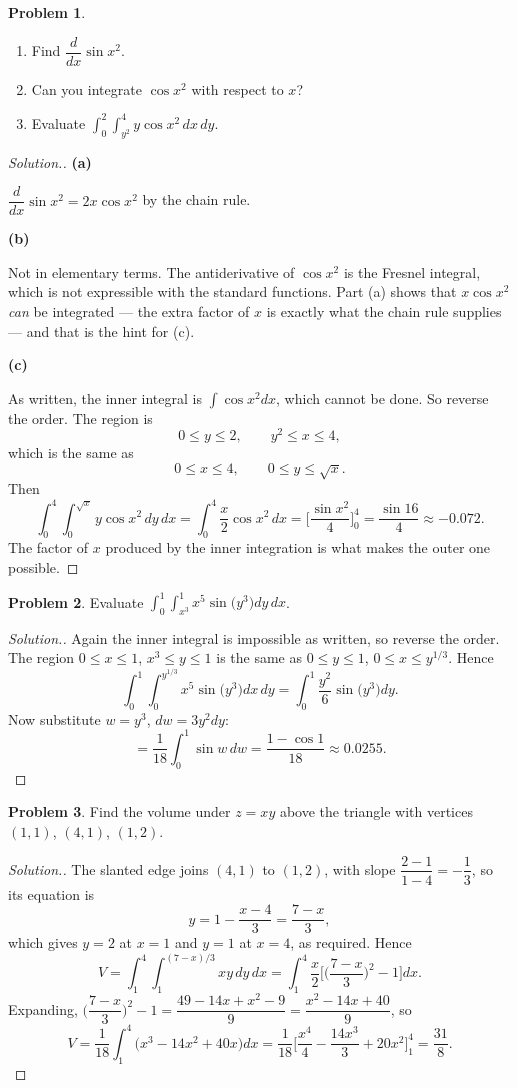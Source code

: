 \documentclass[11pt,a4paper]{article}
\theoremstyle{definition}
\newtheorem{problemx}{Problem}[subsection]
\newenvironment{problem}{\begin{problemx}}{\end{problemx}}
\newenvironment{solution}
  {\renewcommand{\qedsymbol}{}\begin{proof}[\textit{Solution}.]}
  {\end{proof}}
\newcommand{\subhead}[1]{%
  \par\medskip\noindent\textbf{#1}\par\nobreak\smallskip}
\begin{document}
\begin{problem}
\begin{enumerate}
\item[(a)] Find $\dfrac{d}{dx}\sin x^2$.
\item[(b)] Can you integrate $\cos x^2$ with respect to $x$?
\item[(c)] Evaluate
$\displaystyle{\int_0^2\int_{y^2}^4 y\cos x^2\,dx\,dy}$.
\end{enumerate}
\end{problem}
\begin{solution}
\subhead{(a)}
$\dfrac{d}{dx}\sin x^2 = 2x\cos x^2$ by the chain rule.

\subhead{(b)}
Not in elementary terms. The antiderivative of $\cos x^2$ is the Fresnel
integral, which is not expressible with the standard functions. Part (a) shows
that $x\cos x^2$ \emph{can} be integrated --- the extra factor of $x$ is exactly
what the chain rule supplies --- and that is the hint for (c).

\subhead{(c)}
As written, the inner integral is $\int\cos x^2dx$, which cannot be done. So
reverse the order. The region is
$$0\leq y\leq 2,\qquad y^2\leq x\leq 4 ,$$
which is the same as
$$0\leq x\leq 4,\qquad 0\leq y\leq\sqrt x .$$
Then
$$\int_0^4\int_0^{\sqrt x}y\cos x^2\,dy\,dx
= \int_0^4\frac{x}{2}\cos x^2\,dx
= \Big[\frac{\sin x^2}{4}\Big]_0^4 = \frac{\sin 16}{4}\approx -0.072 .$$
The factor of $x$ produced by the inner integration is what makes the outer one
possible.
\end{solution}

\begin{problem}
Evaluate
$\displaystyle{\int_0^1\int_{x^3}^1 x^5\sin\big(y^3\big)dy\,dx}$.
\end{problem}
\begin{solution}
Again the inner integral is impossible as written, so reverse the order. The
region $0\leq x\leq 1$, $x^3\leq y\leq 1$ is the same as
$0\leq y\leq 1$, $0\leq x\leq y^{1/3}$. Hence
$$\int_0^1\int_0^{y^{1/3}}x^5\sin\big(y^3\big)dx\,dy
= \int_0^1\frac{y^2}{6}\sin\big(y^3\big)dy .$$
Now substitute $w = y^3$, $dw = 3y^2dy$:
$$= \frac{1}{18}\int_0^1\sin w\,dw = \frac{1-\cos 1}{18}\approx 0.0255 .$$
\end{solution}

\begin{problem}
Find the volume under $z = xy$ above the triangle with vertices $(1,1)$,
$(4,1)$, $(1,2)$.
\end{problem}
\begin{solution}
The slanted edge joins $(4,1)$ to $(1,2)$, with slope
$\dfrac{2-1}{1-4} = -\dfrac13$, so its equation is
$$y = 1 - \frac{x-4}{3} = \frac{7-x}{3},$$
which gives $y=2$ at $x=1$ and $y=1$ at $x=4$, as required. Hence
$$V = \int_1^4\int_1^{(7-x)/3}xy\,dy\,dx
= \int_1^4\frac{x}{2}\Big[\Big(\frac{7-x}{3}\Big)^2 - 1\Big]dx .$$
Expanding, $\Big(\dfrac{7-x}{3}\Big)^2 - 1 = \dfrac{49-14x+x^2-9}{9}
= \dfrac{x^2-14x+40}{9}$, so
$$V = \frac{1}{18}\int_1^4\big(x^3-14x^2+40x\big)dx
= \frac{1}{18}\Big[\frac{x^4}{4}-\frac{14x^3}{3}+20x^2\Big]_1^4
= \frac{31}{8}.$$
\end{solution}
\end{document}

